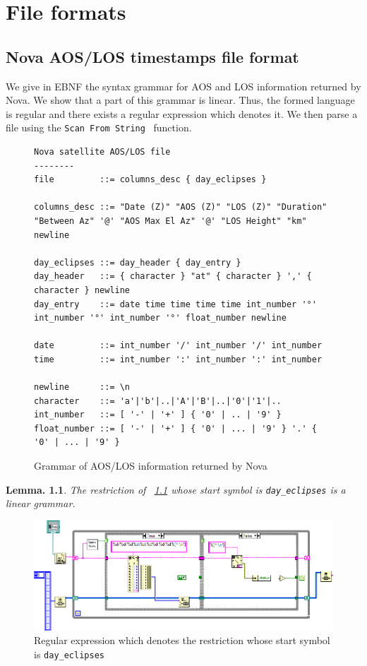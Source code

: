\documentclass[a4paper]{report}
\newtheorem{lemma}[theorem]{Lemma.}
\begin{document}
\chapter{File formats}
\label{sec:file_formats}

\section{Nova AOS/LOS timestamps file format}

We give in EBNF the syntax grammar for AOS and LOS information returned by Nova. We show that a part of this grammar is linear. Thus, the formed language is regular and there exists a regular expression which denotes it. We then parse a file using the \texttt{Scan From String}~\cite{NI_scan_from_string} function. 


\begin{figure}[h]
{\scriptsize
\begin{verbatim}
Nova satellite AOS/LOS file
--------
file         ::= columns_desc { day_eclipses }

columns_desc ::= "Date (Z)" "AOS (Z)" "LOS (Z)" "Duration" "Between Az" '@' "AOS Max El Az" '@' "LOS Height" "km" newline

day_eclipses ::= day_header { day_entry }
day_header   ::= { character } "at" { character } ',' { character } newline
day_entry    ::= date time time time time int_number '°' int_number '°' int_number '°' float_number newline

date         ::= int_number '/' int_number '/' int_number
time         ::= int_number ':' int_number ':' int_number

newline      ::= \n
character    ::= 'a'|'b'|..|'A'|'B'|..|'0'|'1'|..
int_number   ::= [ '-' | '+' ] { '0' | .. | '9' }
float_number ::= [ '-' | '+' ] { '0' | ... | '9' } '.' { '0' | ... | '9' }
\end{verbatim}
}
\caption{Grammar of AOS/LOS information returned by Nova}
\label{fig:EBNF_Nova}
\end{figure}

\begin{lemma}
  The restriction of ~\ref{fig:EBNF_Nova} whose start symbol is \texttt{day\_eclipses} is a linear grammar.
\end{lemma}

\begin{figure}[h]
  \includegraphics[width=17cm]{pictures/parser_nova_labview.png}
  \caption{Regular expression which denotes the restriction whose start symbol is \texttt{day\_eclipses}}
\label{fig:algo_scan_parse_nova_labview}
\end{figure}
\end{document}
